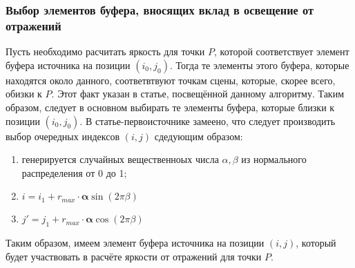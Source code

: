 {{        \subsubsection{Выбор элементов буфера, вносящих вклад в освещение от отражений} {
            Пусть необходимо расчитать яркость для точки $P$, которой соответствует
            элемент буфера источника на позиции $(i_0, j_0)$.
            Тогда те элементы этого буфера, которые находятся около данного,
            соответвтвуют точкам сцены, которые, скорее всего, обизки к $P$.
            Этот факт указан в статье, посвещённой данному алгоритму.
            Таким образом, следует в основном выбирать те элементы буфера,
            которые близки к позиции $(i_0, j_0)$.
            В статье-первоисточнике замеено, что следует производить выбор очередных
            индексов $(i, j)$ сдедующим образом:
            \begin{enumerate}
                \item генерируется случайных вещественноых числа
                $\alpha, \beta$ из нормального распределения от 0 до 1;
                \item $i = i_1 + r_{max} \cdot \mathbf{\alpha} \sin(2\pi\beta)$
                \item  $j' = j_1 + r_{max} \cdot \mathbf{\alpha} \cos(2\pi\beta)$
            \end{enumerate}
            Таким образом, имеем элемент буфера источника на позиции $(i, j)$,
            который будет участвовать в расчёте яркости от отражений для точки $P$.
        }
    }
}